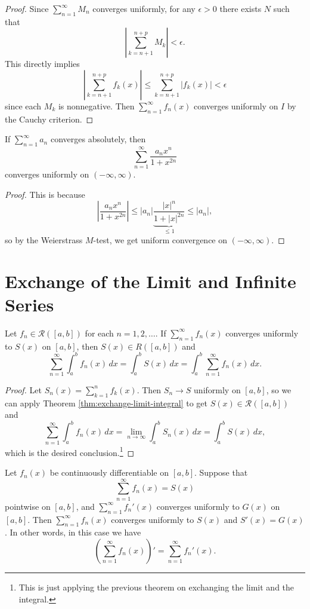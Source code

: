 \begin{proof}
  Since $\sum_{n = 1}^\infty M_n$ converges uniformly,
  for any $\epsilon > 0$ there exists $N$ such that
  \[
    \left| \sum_{k = n + 1}^{n + p} M_k \right| < \epsilon.
  \]
  This directly implies
  \[
    \left| \sum_{k = n + 1}^{n + p} f_k(x) \right|
    \le \sum_{k = n + 1}^{n + p} |f_k(x)|
    < \epsilon
  \]
  since each $M_k$ is nonnegative. Then
  $\sum_{n = 1}^\infty f_n(x)$ converges uniformly on $I$
  by the Cauchy criterion.
\end{proof}

\begin{example}
  If $\sum_{n = 1}^\infty a_n$ converges absolutely,
  then
  \[
    \sum_{n = 1}^\infty \frac{a_n x^n}{1 + x^{2n}}
  \]
  converges uniformly on $(-\infty, \infty)$.
\end{example}

\begin{proof}
  This is because
  \[
    \left| \frac{a_n x^n}{1 + x^{2n}} \right|
    \le |a_n| \underbrace{\frac{|x|^n}{1 + |x|^{2n}}}_{\le 1} \le |a_n|,
  \]
  so by the Weierstrass $M$-test, we get uniform
  convergence on $(-\infty, \infty)$.
\end{proof}

\section{Exchange of the Limit and Infinite Series}

\begin{theorem}
  Let $f_n \in \mathcal{R}([a, b])$ for each $n = 1, 2, \dots$.
  If $\sum_{n = 1}^\infty f_n(x)$ converges uniformly
  to $S(x)$ on $[a, b]$, then $S(x) \in R([a, b])$ and
  \[
    \sum_{n = 1}^\infty \int_a^b f_n(x) \, dx
    = \int_a^b S(x)\, dx
    = \int_a^b \sum_{n = 1}^\infty f_n(x) \, dx.
  \]
\end{theorem}

\begin{proof}
  Let $S_n(x) = \sum_{k = 1}^n f_k(x)$. Then
  $S_n \to S$ uniformly on $[a, b]$, so we can apply
  Theorem \ref{thm:exchange-limit-integral} to get
  $S(x) \in \mathcal{R}([a, b])$ and
  \[
    \sum_{n = 1}^\infty \int_a^b f_n(x) \, dx
    = \lim_{n \to \infty} \int_a^b S_n(x) \, dx
    = \int_a^b S(x) \, dx,
  \]
  which is the desired conclusion.\footnote{This is just applying the previous theorem on exchanging the limit and the integral.}
\end{proof}

\begin{theorem}
  Let $f_n(x)$ be continuously differentiable on
  $[a, b]$. Suppose that
  \[
    \sum_{n = 1}^\infty f_n(x) = S(x)
  \]
  pointwise on $[a, b]$, and $\sum_{n = 1}^\infty f_n'(x)$
  converges uniformly to $G(x)$ on $[a, b]$. Then
  $\sum_{n = 1}^\infty f_n(x)$ converges uniformly
  to $S(x)$ and $S'(x) = G(x)$. In other words, in this
  case we have
  \[
    \left(\sum_{n = 1}^\infty f_n(x)\right)'
    = \sum_{n = 1}^\infty f_n'(x).
  \]
\end{theorem}

